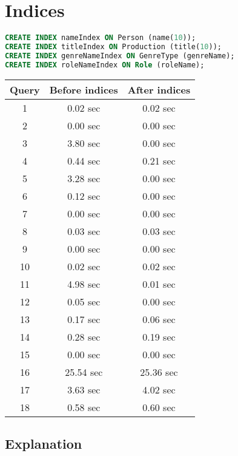 \lstset{
	basicstyle=\normalsize
}

\section{Indices}
\begin{lstlisting}[language=sql]
CREATE INDEX nameIndex ON Person (name(10));
CREATE INDEX titleIndex ON Production (title(10));
CREATE INDEX genreNameIndex ON GenreType (genreName);
CREATE INDEX roleNameIndex ON Role (roleName);
\end{lstlisting}

\begin{table}[ht]
	\begin{tabular}{c|c|c}
		Query & Before indices & After indices\\
		\hline
		1 & 0.02 sec & 0.02 sec\\
		2 & 0.00 sec & 0.00 sec\\
		3 & 3.80 sec & 0.00 sec\\
		4 & 0.44 sec & 0.21 sec\\
		5 & 3.28 sec & 0.00 sec\\
		6 & 0.12 sec & 0.00 sec\\
		7 & 0.00 sec & 0.00 sec\\
		8 & 0.03 sec & 0.03 sec\\
		9 & 0.00 sec & 0.00 sec\\
		10 & 0.02 sec & 0.02 sec\\
		11 & 4.98 sec & 0.01 sec\\
		12 & 0.05 sec & 0.00 sec\\
		13 & 0.17 sec & 0.06 sec\\
		14 & 0.28 sec & 0.19 sec\\
		15 & 0.00 sec & 0.00 sec\\
		16 & 25.54 sec & 25.36 sec\\
		17 & 3.63 sec & 4.02 sec\\
		18 & 0.58 sec & 0.60 sec
	\end{tabular}
\end{table}

\subsection{Explanation}